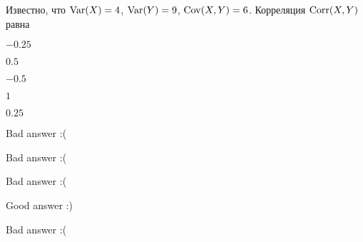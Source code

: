 
\begin{question}
Известно, что \(\operatorname{Var}(X)=4\), \(\operatorname{Var}(Y)=9\), \(\operatorname{Cov}(X, Y)=6\). Корреляция
\(\operatorname{Corr}(X, Y)\) равна
\begin{answerlist}
  \item \(-0.25\)
  \item \(0.5\)
  \item \(-0.5\)
  \item \(1\)
  \item \(0.25\)
\end{answerlist}
\end{question}

\begin{solution}
\begin{answerlist}
  \item Bad answer :(
  \item Bad answer :(
  \item Bad answer :(
  \item Good answer :)
  \item Bad answer :(
\end{answerlist}
\end{solution}

